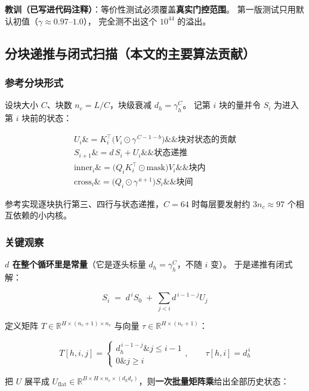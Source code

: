 \documentclass[11pt,openany]{ctexart}
\begin{document}
\begin{notebox}
\textbf{教训（已写进代码注释）}：等价性测试必须覆盖\textbf{真实门控范围}。 第一版测试只用默认初值（$\gamma \approx 0.97$–$1.0$）， 完全测不出这个 $10^{44}$ 的溢出。
\end{notebox}

\subsection{分块递推与闭式扫描（本文的主要算法贡献）}

\subsubsection{参考分块形式}

设块大小 $C$、块数 $n_c = L/C$，块级衰减 $d_h = \gamma_h^{C}$。 记第 $i$ 块的量并令 $S_i$ 为进入第 $i$ 块前的状态：

\[
\begin{aligned}
U_i \&= K_i^{\top}\big(V_i \odot \gamma^{\,C-1-b}\big)
 \&\&\text{块对状态的贡献} \\
S_{i+1} \&= d\, S_i + U_i \&\&\text{状态递推} \\
\text{inner}_i \&= \big(Q_i K_i^{\top} \odot \text{mask}\big) V_i \&\&\text{块内} \\
\text{cross}_i \&= \big(Q_i \odot \gamma^{\,a+1}\big) S_i \&\&\text{块间}
\end{aligned}
\]

参考实现逐块执行第三、四行与状态递推，$C=64$ 时每层要发射约 $3 n_c \approx 97$ 个相互依赖的小内核。

\subsubsection{关键观察}

\textbf{$d$ 在整个循环里是常量}（它是逐头标量 $d_h=\gamma_h^C$，不随 $i$ 变）。 于是递推有闭式解：

\[
S_i \;=\; d^{\,i} S_0 \;+\; \sum_{j<i} d^{\,i-1-j} U_j
\]

定义矩阵 $T \in \mathbb{R}^{H \times (n_c+1) \times n_c}$ 与向量 $\tau \in \mathbb{R}^{H\times(n_c+1)}$：

\[
T[h,i,j] = \begin{cases} d_h^{\,i-1-j} \& j \le i-1 \\ 0 \& j \ge i \end{cases},
\qquad
\tau[h,i] = d_h^{\,i}
\]

把 $U$ 展平成 $U_{\text{flat}} \in \mathbb{R}^{B\times H\times n_c\times (d_k d_v)}$，则\textbf{一次批量矩阵乘}给出全部历史状态：
\end{document}
